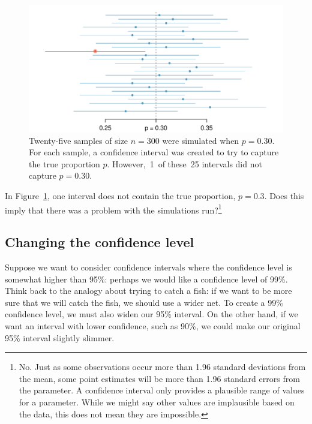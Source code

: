 \begin{figure}[hht]
   \centering
   \includegraphics[width=\textwidth]{02/figures/95PercentConfidenceInterval/95PercentConfidenceInterval}
   \caption{Twenty-five samples of size $n=300$ were simulated when $p = 0.30$. For each sample, a confidence interval was created to try to capture the true proportion $p$. However,~1~of these~25 intervals did not capture $p = 0.30$.}
   \label{95PercentConfidenceInterval}
\end{figure}

\begin{exercise}
In Figure~\ref{95PercentConfidenceInterval}, one interval does not contain the true proportion, $p = 0.3$. Does this imply that there was a problem with the simulations run?\footnote{No. Just as some observations occur more than 1.96 standard deviations from the mean, some point estimates will be more than 1.96 standard errors from the parameter. A confidence interval only provides a plausible range of values for a parameter. While we might say other values are implausible based on the data, this does not mean they are impossible.}
\end{exercise}


\subsection{Changing the confidence level}
\label{changingTheConfidenceLevelSection}


Suppose we want to consider confidence intervals where the confidence level is somewhat higher than 95\%: perhaps we would like a confidence level of 99\%. Think back to the analogy about trying to catch a fish: if we want to be more sure that we will catch the fish, we should use a wider net. To create a 99\% confidence level, we must also widen our 95\% interval. On the other hand, if we want an interval with lower confidence, such as 90\%, we could make our original 95\% interval slightly slimmer.

